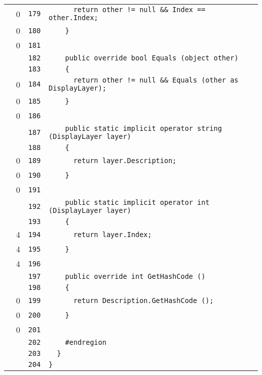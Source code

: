 \documentclass[a4paper,10pt]{article}
\begin{document}
\begin{longtable}[l]{lrrl}
\cellcolor{red} & 0 & \verb~179~ & \verb~      return other != null && Index == other.Index;~\\
\cellcolor{red} & 0 & \verb~180~ & \verb~    }~\\
\cellcolor{red} & 0 & \verb~181~ & \verb~~\\
\cellcolor{gray} &  & \verb~182~ & \verb~    public override bool Equals (object other)~\\
\cellcolor{gray} &  & \verb~183~ & \verb~    {~\\
\cellcolor{red} & 0 & \verb~184~ & \verb~      return other != null && Equals (other as DisplayLayer);~\\
\cellcolor{red} & 0 & \verb~185~ & \verb~    }~\\
\cellcolor{red} & 0 & \verb~186~ & \verb~~\\
\cellcolor{gray} &  & \verb~187~ & \verb~    public static implicit operator string (DisplayLayer layer)~\\
\cellcolor{gray} &  & \verb~188~ & \verb~    {~\\
\cellcolor{red} & 0 & \verb~189~ & \verb~      return layer.Description;~\\
\cellcolor{red} & 0 & \verb~190~ & \verb~    }~\\
\cellcolor{red} & 0 & \verb~191~ & \verb~~\\
\cellcolor{gray} &  & \verb~192~ & \verb~    public static implicit operator int (DisplayLayer layer)~\\
\cellcolor{gray} &  & \verb~193~ & \verb~    {~\\
\cellcolor{green} & 4 & \verb~194~ & \verb~      return layer.Index;~\\
\cellcolor{green} & 4 & \verb~195~ & \verb~    }~\\
\cellcolor{green} & 4 & \verb~196~ & \verb~~\\
\cellcolor{gray} &  & \verb~197~ & \verb~    public override int GetHashCode ()~\\
\cellcolor{gray} &  & \verb~198~ & \verb~    {~\\
\cellcolor{red} & 0 & \verb~199~ & \verb~      return Description.GetHashCode ();~\\
\cellcolor{red} & 0 & \verb~200~ & \verb~    }~\\
\cellcolor{red} & 0 & \verb~201~ & \verb~~\\
\cellcolor{gray} &  & \verb~202~ & \verb~    #endregion~\\
\cellcolor{gray} &  & \verb~203~ & \verb~  }~\\
\cellcolor{gray} &  & \verb~204~ & \verb~}~\\
\end{longtable}
\newpage
\end{document}
